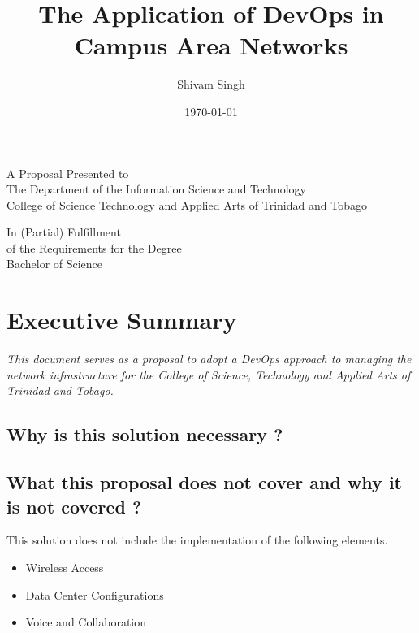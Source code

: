 \documentclass[12pt, letterpaper]{article}
\begin{document}
\title{The Application of DevOps in Campus Area Networks}
\author{Shivam Singh}
\date{\today}
\maketitle


\begin{center}

A Proposal Presented to\\ 
The Department of the Information Science and Technology\\
College of Science Technology and Applied Arts of Trinidad and Tobago 

\vspace{1cm}

In (Partial) Fulfillment\\
of the Requirements for the Degree\\
Bachelor of Science

\end{center}

\newpage
\tableofcontents

\newpage

\section{Executive Summary}

\begin{center}
\textit{This document serves as a proposal to adopt a DevOps approach to managing the network infrastructure for the College of Science, Technology and Applied Arts of Trinidad and Tobago.}
\end{center}

	\subsection{Why is this solution necessary ?}
	\subsection{What this proposal does not cover and why it is not covered ?}
This solution does not include the implementation of the following elements.
\begin{itemize}
\item Wireless Access
\item Data Center Configurations
\item Voice and Collaboration
\end{itemize}
\end{document}
